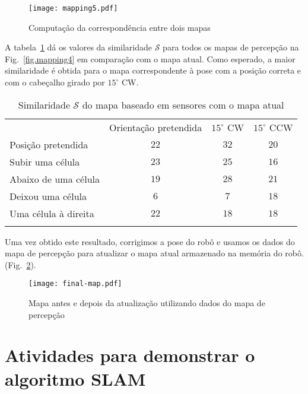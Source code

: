\begin{figure}
\begin{center}
\texttt{[image: mapping5.pdf]}
\end{center}
\caption{Computação da correspondência entre dois mapas}\label{fig.mapping5}
\end{figure}

A tabela~\ref{tab.matching} dá os valores da similaridade $\mathcal{S}$ para todos os mapas de percepção na Fig.~\ref{fig.mapping4} em comparação com o mapa atual. Como esperado, a maior similaridade é obtida para o mapa correspondente à pose com a posição correta e com o cabeçalho girado por $15^\circ$ CW.

\begin{table}
\caption{Similaridade $\mathcal{S}$ do mapa baseado em sensores com o mapa atual}
\label{tab.matching}
\renewcommand{\arraystretch}{1.2}
\setlength{\tabcolsep}{8pt}
\begin{tabular}{p{22mm}ccc}
\hline\noalign{\smallskip}
&Orientação pretendida&$15^{\circ}$ CW&$15^{\circ}$ CCW\\
Posição pretendida & $22$ & \boldmath $32$ & $20$\\
Subir uma célula       & $23$ & $25$ & $16$\\
Abaixo de uma célula     & $19$ & $28$ & $21$\\
Deixou uma célula     & $6$  & $7$  & $18$\\
Uma célula à direita    & $22$ & $18$ & $18$\\
\noalign{\smallskip}\hline\noalign{\smallskip}
\end{tabular}
\end{table}

Uma vez obtido este resultado, corrigimos a pose do robô e usamos os dados do mapa de percepção para atualizar o mapa atual armazenado na memória do robô. (Fig.~\ref{fig.final-map}).

\begin{figure}
\begin{center}
\texttt{[image: final-map.pdf]}
\end{center}
\caption{Mapa antes e depois da atualização utilizando dados do mapa de percepção}\label{fig.final-map}
\end{figure}
\smallskip

\section{Atividades para demonstrar o algoritmo SLAM}\label{s.slam-activities}

